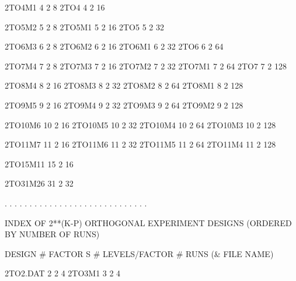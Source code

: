   2TO4M1         4            2                      8
  2TO4           4            2                     16
 
  2TO5M2         5            2                      8
  2TO5M1         5            2                     16
  2TO5           5            2                     32
 
  2TO6M3         6            2                      8
  2TO6M2         6            2                     16
  2TO6M1         6            2                     32
  2TO6           6            2                     64
 
  2TO7M4         7            2                      8
  2TO7M3         7            2                     16
  2TO7M2         7            2                     32
  2TO7M1         7            2                     64
  2TO7           7            2                    128
 
  2TO8M4         8            2                     16
  2TO8M3         8            2                     32
  2TO8M2         8            2                     64
  2TO8M1         8            2                    128
 
  2TO9M5         9            2                     16
  2TO9M4         9            2                     32
  2TO9M3         9            2                     64
  2TO9M2         9            2                    128
 
  2TO10M6       10            2                     16
  2TO10M5       10            2                     32
  2TO10M4       10            2                     64
  2TO10M3       10            2                    128
 
  2TO11M7       11            2                     16
  2TO11M6       11            2                     32
  2TO11M5       11            2                     64
  2TO11M4       11            2                    128
 
  2TO15M11      15            2                     16
 
  2TO31M26      31            2                     32
 
. . . . . . . . . . . . . . . . . . . . . . . . . . . . .
 
  INDEX OF 2**(K-P) ORTHOGONAL EXPERIMENT DESIGNS
           (ORDERED BY NUMBER OF RUNS)
 
  DESIGN     # FACTOR S    # LEVELS/FACTOR        # RUNS
(& FILE NAME)
 
  2TO2.DAT       2            2                      4
  2TO3M1         3            2                      4
 
